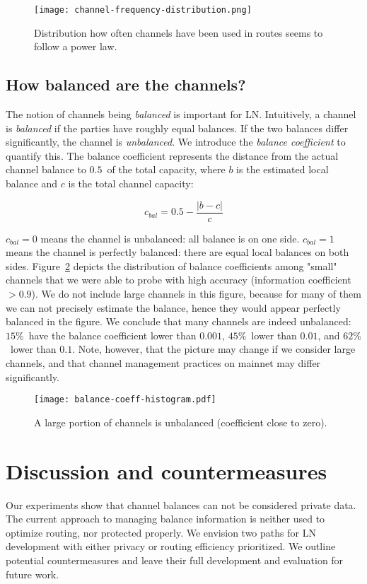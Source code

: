 \begin{figure}[]
	\centering
	\texttt{[image: channel-frequency-distribution.png]}
	\caption{Distribution how often channels have been used in routes seems to follow a power law.}
	\label{fig:channel-frequency-distribution}
\end{figure}


\subsection{How balanced are the channels?}
The notion of channels being \textit{balanced} is important for LN.
Intuitively, a channel is \textit{balanced} if the parties have roughly equal balances.
If the two balances differ significantly, the channel is \textit{unbalanced}.
We introduce the \textit{balance coefficient} to quantify this.
The balance coefficient represents the distance from the actual channel balance to $0.5$~of the total capacity, where $b$ is the estimated local balance and $c$ is the total channel capacity:

\[c_{bal} = 0.5 - \frac{|b-c|}{c} \]

$c_{bal} = 0$ means the channel is unbalanced: all balance is on one side.
$c_{bal} = 1$ means the channel is perfectly balanced: there are equal local balances on both sides.
Figure~\ref{fig:balance-coeff-histogram} depicts the distribution of balance coefficients among "small" channels that we were able to probe with high accuracy (information coefficient $> 0.9$).
We do not include large channels in this figure, because for many of them we can not precisely estimate the balance, hence they would appear perfectly balanced in the figure.
We conclude that many channels are indeed unbalanced: $15\%$~have the balance coefficient lower than $0.001$, $45\%$~lower than $0.01$, and $62\%$~lower than $0.1$.
Note, however, that the picture may change if we consider large channels, and that channel management practices on mainnet may differ significantly.

\begin{figure}[]
	\centering
	\texttt{[image: balance-coeff-histogram.pdf]}
	\caption{A large portion of channels is unbalanced (coefficient close to zero).}
	\label{fig:balance-coeff-histogram}
\end{figure}





\section{Discussion and countermeasures} \label{sec:discussion}
Our experiments show that channel balances can not be considered private data.
The current approach to managing balance information is neither used to optimize routing, nor protected properly.
We envision two paths for LN development with either privacy or routing efficiency prioritized.
We outline potential countermeasures and leave their full development and evaluation for future work.

